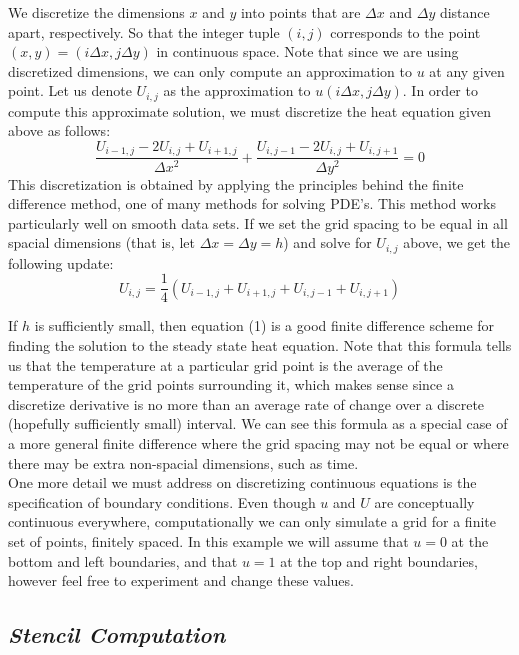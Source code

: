 \documentclass[11pt,a4paper,oneside]{report}
\begin{document}
We discretize the dimensions $x$ and $y$ into points that are $\Delta x$ and $\Delta y$ distance apart, respectively. So that the integer tuple $(i,j)$ corresponds to the point $(x,y) = (i\Delta x, j \Delta y)$ in continuous space. Note that since we are using discretized dimensions, we can only compute an approximation to $u$ at any given point. Let us denote $U_{i,j}$ as the approximation to $u(i\Delta x, j \Delta y)$. In order to compute this approximate solution, we must discretize the heat equation given above as follows:
\[\frac{U_{i-1,j} - 2U_{i,j} + U_{i+1,j}}{\Delta x^2} + \frac{U_{i,j-1} - 2U_{i,j} + U_{i,j+1}}{\Delta y^2} = 0\]
This discretization is obtained by applying the principles behind the finite difference method, one of many methods for solving PDE's. This method works particularly well on smooth data sets. If we set the grid spacing to be equal in all spacial dimensions (that is,  let $\Delta x = \Delta y = h$) and solve for $U_{i,j}$ above, we get the following update:
\begin{equation}
\boxed{U_{i,j} = \frac{1}{4} (U_{i-1,j} + U_{i+1,j} +  U_{i,j-1} + U_{i,j+1})}
\end{equation}

If $h$ is sufficiently small, then equation (1) is a good finite difference scheme for finding the solution to the steady state heat equation. Note that this formula tells us that the temperature at a particular grid point is the average of the temperature of the grid points surrounding it, which makes sense since a discretize derivative is no more than an average rate of change over a discrete (hopefully sufficiently small) interval. We can see this formula as a special case of a more general finite difference where the grid spacing may not be equal or where there may be extra non-spacial dimensions, such as time.\\

One more detail we must address on discretizing continuous equations is the specification of boundary conditions. Even though $u$ and $U$ are conceptually continuous everywhere, computationally we can only simulate a grid for a finite set of points, finitely spaced. In this example we will assume that $u = 0$ at the bottom and left boundaries, and that $u=1$ at the top and right boundaries, however feel free to experiment and change these values.
\newpage

{\center\color{magenta}
\subsection*{\it\huge Stencil Computation}}
\end{document}
